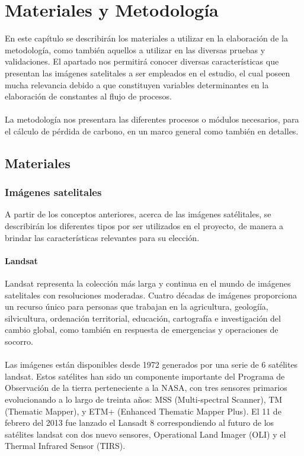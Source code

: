 \newpage{\ } 
\thispagestyle{empty} 

\chapter{Materiales y Metodolog\'ia}
En este cap\'itulo se describir\'an los materiales a utilizar en la elaboraci\'on de la metodolog\'ia, como tambi\'en aquellos a utilizar en las diversas pruebas y validaciones. El apartado nos permitir\'a conocer diversas caracter\'isticas que presentan las im\'agenes satelitales a ser empleados en el estudio, el cual poseen mucha relevancia debido a que constituyen variables determinantes en la elaboraci\'on de constantes al flujo de procesos.\\~\\
La metodolog\'ia nos presentara las diferentes procesos o m\'odulos necesarios, para el c\'alculo de p\'erdida de carbono, en un marco general como tambi\'en en detalles.
\section{Materiales}
\subsection{Im\'agenes satelitales}
A partir de los conceptos anteriores, acerca de las im\'agenes sat\'elitales, se describir\'an los diferentes tipos por ser utilizados en el proyecto, de manera a brindar las caracter\'isticas relevantes para su elecci\'on. 
\subsubsection{Landsat}\label{sec:landsat}
Landsat representa la colecci\'on m\'as larga y continua en el mundo de im\'agenes satelitales con resoluciones moderadas. Cuatro d\'ecadas de im\'agenes proporciona un recurso \'unico para personas que trabajan en la agricultura, geologí\'ia, silvicultura, ordenaci\'on territorial, educaci\'on, cartograf\'ia e investigaci\'on del cambio global, como tambi\'en en respuesta de emergencias y operaciones de socorro\cite{landsatNasa}.\\~\\
Las im\'agenes est\'an disponibles desde 1972 generados por una serie de 6 sat\'elites landsat. Estos sat\'elites han sido un componente importante del Programa de Observaci\'on de la tierra perteneciente a la NASA, con tres sensores primarios evolucionando a lo largo de treinta años: MSS (Multi-spectral Scanner), TM (Thematic Mapper), y ETM+ (Enhanced Thematic Mapper Plus). 
El 11 de febrero del 2013 fue lanzado el Lansadt 8 correspondiendo al futuro de los sat\'elites landsat con dos nuevo sensores, Operational Land Imager (OLI) y el Thermal Infrared Sensor (TIRS).


